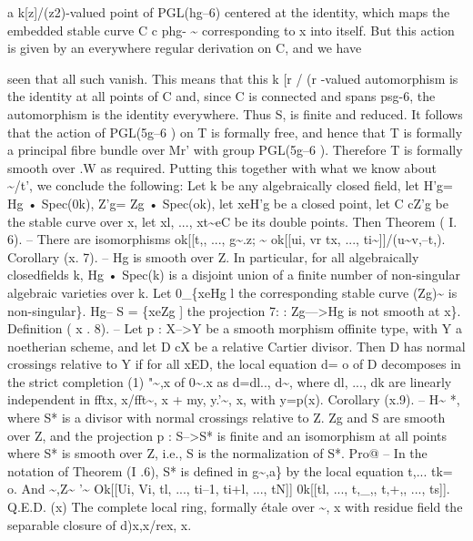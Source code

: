\documentclass[11pt]{article}
\theoremstyle{plain}
\theoremstyle{definition}
\theoremstyle{remark}
\begin{document}
a k[z]/(z2)-valued point of PGL(hg--6) centered at the identity, which maps the embedded stable curve C c phg- \textasciitilde{} corresponding to x into itself. But this action is given by an everywhere regular derivation on C, and we have

seen that all such vanish. This means that this k [r / (r -valued automorphism is the identity at all points of C and, since C is connected and spans psg-6, the automorphism is the identity everywhere. Thus S, is finite and reduced. It follows that the action of PGL(5g--6 ) on T is formally free, and hence that T is formally a principal fibre bundle over Mr' with group PGL(5g--6 ). Therefore T is formally smooth over .W as required. Putting this together with what we know about \textasciitilde{}/t', we conclude the following: Let k be any algebraically closed field, let H'g= Hg • Spec(0k), Z'g= Zg • Spec(ok), let xeH'g be a closed point, let C cZ'g be the stable curve over x, let xl, ..., xt\textasciitilde{}eC be its double points. Then Theorem ( I. 6). -- There are isomorphisms ok[[t,, ..., g\textasciitilde{}.z; \textasciitilde{} ok[[ui, vr tx, ..., ti\textasciitilde{}]]/(u\textasciitilde{}v,--t,). Corollary (x. 7). -- Hg is smooth over Z. In particular, for all algebraically closedfields k, Hg • Spec(k) is a disjoint union of a finite number of non-singular algebraic varieties over k. Let 0\_\{xeHg l the corresponding stable curve (Zg)\textasciitilde{} is non-singular\}. Hg-- S = \{xeZg ] the projection 7: : Zg--->Hg is not smooth at x\}. Definition ( x . 8). -- Let p : X-->Y be a smooth morphism offinite type, with Y a noetherian scheme, and let D cX be a relative Cartier divisor. Then D has normal crossings relative to Y if for all xED, the local equation d= o of D decomposes in the strict completion (1) "\textasciitilde{},x of 0\textasciitilde{}.x as d=dl.., d\textasciitilde{}, where dl, ..., dk are linearly independent in fftx, x/fft\textasciitilde{}, x + my, y.'\textasciitilde{}, x, with y=p(x). Corollary (x.9). -- H\textasciitilde{} *, where S* is a divisor with normal crossings relative to Z. Zg and S are smooth over Z, and the projection p : S-->S* is finite and an isomorphism at all points where S* is smooth over Z, i.e., S is the normalization of S*. Pro@ -- In the notation of Theorem (I .6), S* is defined in g\textasciitilde{},a\} by the local equation t,... tk= o. And \textasciitilde{},Z\textasciitilde{} '\textasciitilde{} Ok[[Ui, Vi, tl, ..., ti--1, ti+l, ..., tN]] 0k[[tl, ..., t,\_,, t,+,, ..., ts]]. Q.E.D. (x) The complete local ring, formally étale over \textasciitilde{}, x with residue field the separable closure of d)x,x/rex, x.
\end{document}
